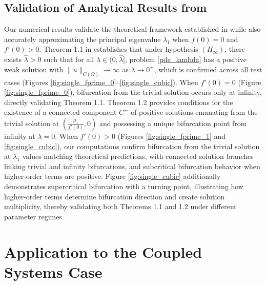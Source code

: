 \documentclass[12pt, reqno]{amsart}
\numberwithin{equation}{section}
\begin{document}
\subsection{Validation of Analytical Results from \cite{BCDMP_2024}}
\label{subsec:connection-single}
Our numerical results validate the theoretical framework established in \cite{BCDMP_2024} while also accurately approximating the principal eigenvalue $\lambda_1$ when $f(0) = 0$ and $f'(0) > 0$. Theorem 1.1 in \cite{BCDMP_2024} establishes that under hypothesis $(H_\infty)$, there exists $\hat{\lambda} > 0$ such that for all $\lambda \in (0, \hat{\lambda}]$, problem \eqref{pde_lambda} has a positive weak solution with $\|u\|_{C(\Omega)} \to \infty$ as $\lambda \to 0^+$, which is confirmed across all test cases (Figures \ref{fig:single_fprime_0}--\ref{fig:single_cubic}). When $f'(0) = 0$ (Figure \ref{fig:single_fprime_0}), bifurcation from the trivial solution occurs only at infinity, directly validating Theorem 1.1. Theorem 1.2 provides conditions for the existence of a connected component $C^+$ of positive solutions emanating from the trivial solution at $(\frac{\mu_1}{f'(0)}, 0)$ and possessing a unique bifurcation point from infinity at $\lambda = 0$. When $f'(0) > 0$ (Figures \ref{fig:single_fprime_1} and \ref{fig:single_cubic}), our computations confirm bifurcation from the trivial solution at $\lambda_1$ values matching theoretical predictions, with connected solution branches linking trivial and infinity bifurcations, and subcritical bifurcation behavior when higher-order terms are positive. Figure \ref{fig:single_cubic} additionally demonstrates supercritical bifurcation with a turning point, illustrating how higher-order terms determine bifurcation direction and create solution multiplicity, thereby validating both Theorems 1.1 and 1.2 under different parameter regimes.






\section{Application to the Coupled Systems Case} 
\label{sec:coupled-systems}
\end{document}
